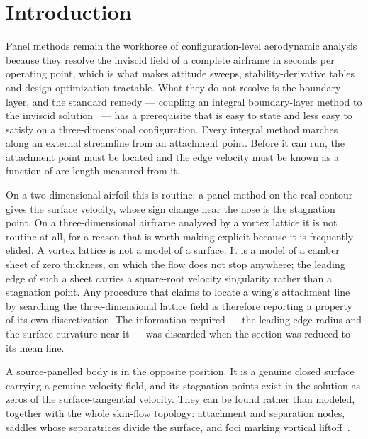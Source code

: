 \documentclass[submit]{aiaa-tc}%
\begin{document}
\section{Introduction}

Panel methods remain the workhorse of configuration-level aerodynamic
analysis because they resolve the inviscid field of a complete airframe in
seconds per operating point, which is what makes attitude sweeps,
stability-derivative tables and design optimization tractable. What they
do not resolve is the boundary layer, and the standard remedy --- coupling
an integral boundary-layer method to the inviscid
solution~\cite{cebeciCousteix2005,drela1989} --- has a prerequisite that
is easy to state and less easy to satisfy on a three-dimensional
configuration. Every integral method marches along an external streamline
from an attachment point. Before it can run, the attachment point must be
located and the edge velocity must be known as a function of arc length
measured from it.

On a two-dimensional airfoil this is routine: a panel method on the real
contour gives the surface velocity, whose sign change near the nose is the
stagnation point. On a three-dimensional airframe analyzed by a vortex
lattice it is not routine at all, for a reason that is worth making
explicit because it is frequently elided. A vortex lattice is not a model
of a surface. It is a model of a camber sheet of zero thickness, on which
the flow does not stop anywhere; the leading edge of such a sheet carries
a square-root velocity singularity rather than a stagnation point. Any
procedure that claims to locate a wing's attachment line by searching the
three-dimensional lattice field is therefore reporting a property of its
own discretization. The information required --- the leading-edge radius
and the surface curvature near it --- was discarded when the section was
reduced to its mean line.

A source-panelled body is in the opposite position. It is a genuine closed
surface carrying a genuine velocity field, and its stagnation points exist
in the solution as zeros of the surface-tangential velocity. They can be
found rather than modeled, together with the whole skin-flow topology:
attachment and separation nodes, saddles whose separatrices divide the
surface, and foci marking vortical
liftoff~\cite{lighthill1963,tobakPeake1982}.
\end{document}
